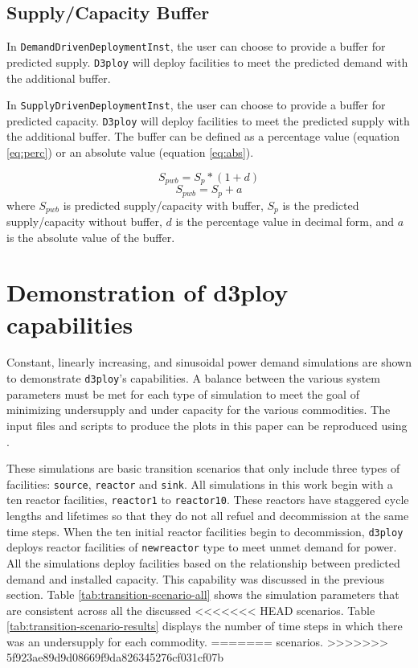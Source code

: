 \documentclass[11pt,letterpaper]{article}
\newcommand{\deploy}{\texttt{d3ploy}\xspace}%
\newcommand{\Deploy}{\texttt{D3ploy}\xspace}%
\begin{document}
\subsection{\textbf{Supply/Capacity Buffer}}
In \texttt{DemandDrivenDeploymentInst}, the user can choose to provide a
buffer for predicted supply.
\Deploy will deploy facilities to meet the predicted demand with the 
additional buffer. 

In \texttt{SupplyDrivenDeploymentInst}, the user can choose to 
provide a buffer for predicted capacity.
\Deploy will deploy facilities to meet the predicted supply with the 
additional buffer. 
The buffer can be defined as a percentage value (equation \ref{eq:perc}) 
or an absolute value (equation \ref{eq:abs}).  

\begin{equation}
    \label{eq:perc}
    S_{pwb} = S_{p}*(1+d)
\end{equation}
\begin{equation}
    \label{eq:abs}
    S_{pwb} = S_{p}+a
\end{equation}
where $S_{pwb}$ is predicted supply/capacity with buffer, 
$S_p$ is the predicted supply/capacity without buffer, 
$d$ is the percentage value in decimal form, 
and $a$ is the absolute value of the buffer. 

\section{Demonstration of d3ploy capabilities}
Constant, linearly increasing, and sinusoidal power demand simulations
are shown to demonstrate \deploy's capabilities. 
A balance between the various system parameters must be 
met for each type of simulation to meet the goal of 
minimizing undersupply and under capacity for the various 
commodities. 
The input files and scripts to produce the plots in this paper 
can be reproduced using \cite{d3ploy_doi_2019}.

These simulations are basic transition scenarios that only include
three types of facilities: \texttt{source}, \texttt{reactor} and 
\texttt{sink}.
All simulations in this work begin with a ten reactor facilities, 
\texttt{reactor1} to \texttt{reactor10}. 
These reactors have staggered cycle lengths and lifetimes 
so that they do not all refuel and decommission at the same time 
steps. 
When the ten initial reactor facilities begin to decommission, 
\deploy deploys reactor facilities of \texttt{newreactor} type
to meet unmet demand for power. 
All the simulations deploy facilities based on the relationship
between predicted demand and installed capacity. 
This capability was discussed in the previous section.  
Table \ref{tab:transition-scenario-all} shows the simulation 
parameters that are consistent across all the discussed 
<<<<<<< HEAD
scenarios. Table \ref{tab:transition-scenario-results} displays
the number of time steps in which there was an undersupply for
each commodity.
=======
scenarios. 
>>>>>>> 5f923ae89d9d08669f9da826345276cf031cf07b
\end{document}
